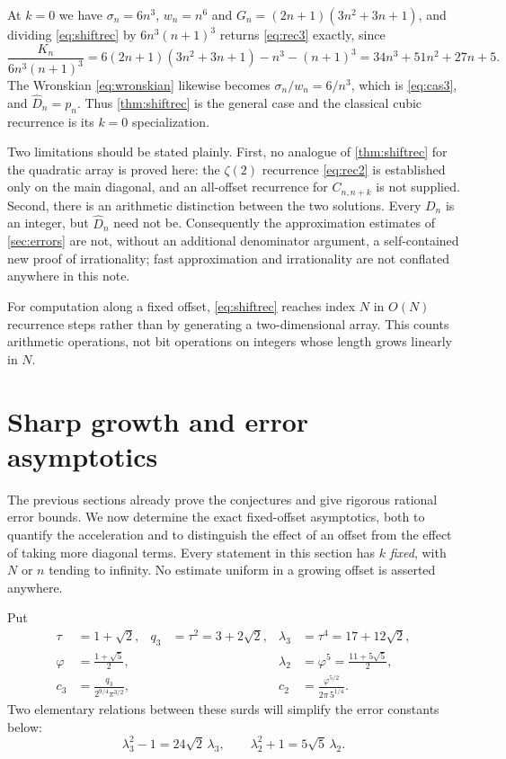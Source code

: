\documentclass[11pt,letterpaper]{article}
\numberwithin{equation}{section}
\theoremstyle{definition}
\begin{document}
At $k=0$ we have $\sigma_n=6n^3$, $w_n=n^6$ and
$G_n=(2n+1)(3n^2+3n+1)$, and dividing \eqref{eq:shiftrec} by
$6n^3(n+1)^3$ returns \eqref{eq:rec3} exactly, since
\[
 \frac{K_n}{6n^3(n+1)^3}
 =6(2n+1)(3n^2+3n+1)-n^3-(n+1)^3
 =34n^3+51n^2+27n+5 .
\]
The Wronskian \eqref{eq:wronskian} likewise becomes
$\sigma_n/w_n=6/n^3$, which is \eqref{eq:cas3}, and
$\widehat D_n=p_n$. Thus \cref{thm:shiftrec} is the general case and the
classical cubic recurrence is its $k=0$ specialization.

Two limitations should be stated plainly. First, no analogue of
\cref{thm:shiftrec} for the quadratic array is proved here: the
$\zeta(2)$ recurrence \eqref{eq:rec2} is established only on the main
diagonal, and an all-offset recurrence for $C_{n,n+k}$ is not supplied.
Second, there is an arithmetic distinction between the two solutions.
Every $D_n$ is an integer, but $\widehat D_n$ need not be. Consequently
the approximation estimates of \cref{sec:errors} are not, without an
additional denominator argument, a self-contained new proof of
irrationality; fast approximation and irrationality are not conflated
anywhere in this note.

For computation along a fixed offset, \eqref{eq:shiftrec} reaches index
$N$ in $O(N)$ recurrence steps rather than by generating a
two-dimensional array. This counts arithmetic operations, not bit
operations on integers whose length grows linearly in $N$.

\section{Sharp growth and error asymptotics}\label{sec:asymptotics}

The previous sections already prove the conjectures and give rigorous
rational error bounds. We now determine the exact fixed-offset
asymptotics, both to quantify the acceleration and to distinguish the
effect of an offset from the effect of taking more diagonal terms.
Every statement in this section has $k$ \emph{fixed}, with $N$ or $n$
tending to infinity. No estimate uniform in a growing offset is asserted
anywhere.

Put
\begin{align}
 \tau&=1+\sqrt2,& q_3&=\tau^2=3+2\sqrt2,&
 \lambda_3&=\tau^4=17+12\sqrt2,\label{eq:constants3}\\
 \varphi&=\frac{1+\sqrt5}{2},&&&
 \lambda_2&=\varphi^5=\frac{11+5\sqrt5}{2},\label{eq:constants2}\\
 c_3&=\frac{q_3}{2^{9/4}\pi^{3/2}},&&&
 c_2&=\frac{\varphi^{5/2}}{2\pi\,5^{1/4}}.\label{eq:cconstants}
\end{align}
Two elementary relations between these surds will simplify the error
constants below:
\begin{equation}\label{eq:surd}
 \lambda_3^2-1=24\sqrt2\,\lambda_3,\qquad
 \lambda_2^2+1=5\sqrt5\,\lambda_2.
\end{equation}
\end{document}
